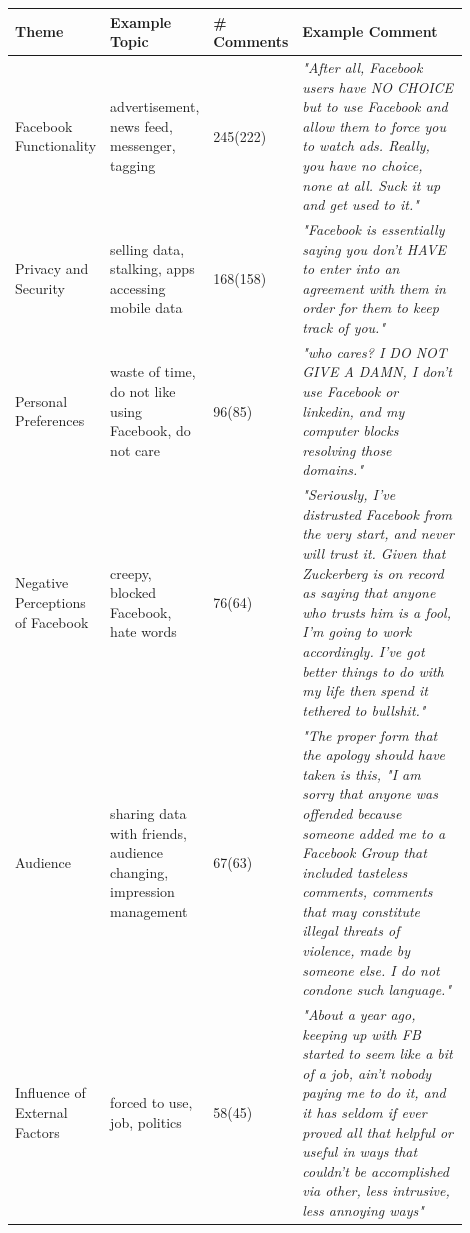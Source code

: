 \begin{table}[t!]

\centering
\begin{tabular}{p{0.20\linewidth}|p{0.2\linewidth}|p{0.1\linewidth}|p{0.4\linewidth}}
\hline
{Theme} & {Example Topic} & {\# Comments} & {Example Comment}  \\
\hline
Facebook Functionality  & advertisement, news feed, messenger, tagging   & 245(222) & \textit{"After all, Facebook users have NO CHOICE but to use Facebook and allow them to force you to watch ads. Really, you have no choice, none at all. Suck it up and get used to it."}\\\hline

Privacy and Security & selling data, stalking, apps accessing mobile data & 168(158) &\textit{"Facebook is essentially saying you don't HAVE to enter into an agreement with them in order for them to keep track of you."}\\\hline

Personal Preferences & waste of time, do not like using Facebook, do not care & 96(85) &\textit{"who cares? I DO NOT GIVE A DAMN, I don't use Facebook or linkedin, and my computer blocks resolving those domains."}\\\hline

Negative Perceptions of Facebook & creepy, blocked Facebook, hate words & 76(64) &\textit{"Seriously, I've distrusted Facebook from the very start, and never will trust it. Given that Zuckerberg is on record as saying that anyone who trusts him is a fool, I'm going to work accordingly. I've got better things to do with my life then spend it tethered to bullshit."}\\\hline

Audience & sharing data with friends, audience changing, impression management & 67(63) &\textit{"The proper form that the apology should have taken is this, "I am sorry that anyone was offended because someone added me to a Facebook Group that included tasteless comments, comments that may constitute illegal threats of violence, made by someone else. I do not condone such language."}\\\hline

Influence of External Factors & forced to use, job, politics & 58(45) &\textit{"About a year ago, keeping up with FB started to seem like a bit of a job, ain't nobody paying me to do it, and it has seldom if ever proved all that helpful or useful in ways that couldn't be accomplished via other, less intrusive, less annoying ways"}\\\hline


\end{tabular}
\end{table}
